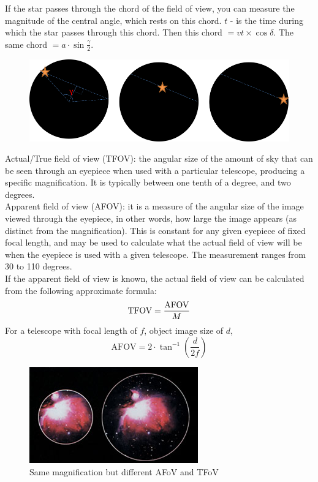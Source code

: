 \documentclass[a4paper,12pt]{extarticle}
\begin{document}
If the star passes through the chord of the field of view, you can measure the magnitude of the central angle, which rests on this chord. $t$ - is the time during which the star passes through this chord. Then this chord $= vt \times \cos\delta $. The same chord $=a\cdot \sin\frac{\gamma}{2}$. 

\begin{figure}[H]
	\centering
	\includegraphics[width=0.9\linewidth]{FOV2.png}
\end{figure}

\textsf{Actual/True field of view (TFOV):} the angular size of the amount of sky that can	be seen through an eyepiece when used with a particular telescope, producing a specific magnification. It is typically between one tenth of a degree, and two degrees.\\ 

\textsf{Apparent field of view (AFOV):} it is a measure of the angular size of the image viewed through the eyepiece, in other words, how large the image appears (as distinct from the magnification). This is constant for any given eyepiece of fixed focal length, and may be used to calculate what the actual field of view will be when the eyepiece is used with a given telescope. The measurement ranges from 30 to 110 degrees.\\

If the apparent field of view is known, the actual field of view can be calculated from the following approximate formula:
$$\text{TFOV}=\frac{\rm AFOV}{M}$$
For a telescope with focal length of $f$, object image size of $d$,
$$\text{AFOV}=2\cdot \tan^{-1}\left(\frac{d}{2f}\right)$$ 

\begin{figure}[H]
	\centering
	\includegraphics[width=0.4\linewidth]{FOV.png}
	\caption{Same magnification but different AFoV and TFoV}
\end{figure}
\end{document}
